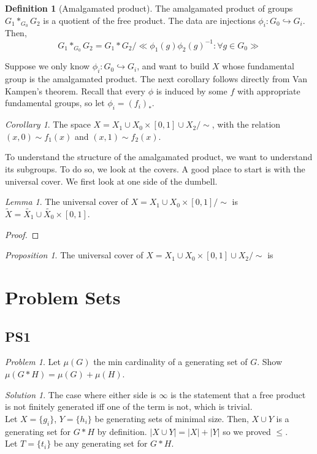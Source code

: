 \documentclass[11pt]{article}
\theoremstyle{definition}
\newtheorem{definition}{Definition}[section]
\theoremstyle{example}
\theoremstyle{remark}
\theoremstyle{lemma}
\newtheorem{lemma}{Lemma}[section]
\theoremstyle{proposition}
\newtheorem{proposition}{Proposition}[section]
\theoremstyle{Problem}
\newtheorem{problem}{Problem}[section]
\theoremstyle{Solution}
\newtheorem{solution}{Solution}[section]
\theoremstyle{theorem}
\theoremstyle{corollary}
\newtheorem{corollary}{Corollary}[section]
\begin{document}
\begin{definition}[Amalgamated product]
The amalgamated product of groups $G_1 \ast_{G_0} G_2$ is a quotient of the free product.
The data are injections $\phi_i : G_0 \hookrightarrow G_i$. Then,
$$G_1 \ast_{G_0} G_2 = G_1 * G_2 / \ll \phi_1(g)\phi_2(g)^{-1} : \forall g \in G_0\gg$$
\end{definition}
Suppose we only know $\phi_i : G_0 \hookrightarrow G_i$, and want to build $X$ whose fundamental group is the amalgamated product. The next corollary follows directly from Van Kampen's theorem. Recall that every $\phi$ is induced by some $f$ with appropriate fundamental groups, so let $\phi_i = (f_i)_*$.
\begin{corollary}
The space $X = X_1\cup X_0 \times [0,1] \cup X_2/\sim$, with the relation $(x,0) \sim f_1(x)$ and $(x,1) \sim f_2(x)$. 
\end{corollary}
To understand the structure of the amalgamated product, we want to understand its subgroups. To do so, we look at the covers. A good place to start is with the universal cover. We first look at one side of the dumbell.
\begin{lemma}
The universal cover of $X=X_1\cup X_0\times[0,1]/\sim$ is $\widetilde{X} = \widetilde{X_1} \cup \widetilde{X_0}\times [0,1]$.
\end{lemma}
\begin{proof}

\end{proof}

\begin{proposition}
The universal cover of $X= X_1\cup X_0 \times [0,1] \cup X_2/\sim$ is 
\end{proposition}

\section{Problem Sets}
\subsection{PS1}
\begin{problem}
Let $\mu(G)$ the min cardinality of a generating set of $G$. Show $\mu(G*H) = \mu(G) + \mu(H)$.
\end{problem}
\begin{solution}
The case where either side is $\infty$ is the statement that a free product is not finitely generated iff one of the term is not, which is trivial.\\
Let $X=\{g_i\}$, $Y=\{h_i\}$ be generating sets of minimal size. Then, $X\cup Y$ is a generating set for $G*H$ by definition. $|X\cup Y| = |X| + |Y|$ so we proved $\leq$.\\
Let $T=\{t_i\}$ be any generating set for $G*H$.
\end{solution}
\end{document}
